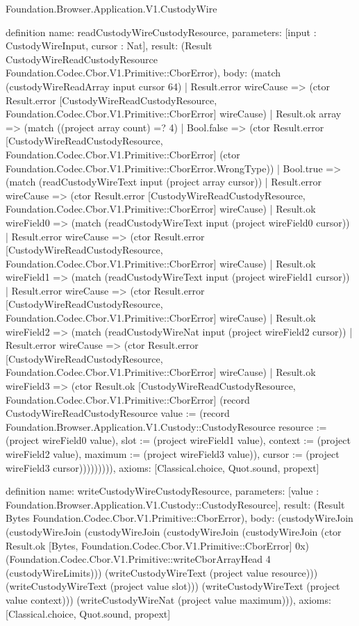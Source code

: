 \begin{lexlean}{Foundation.Browser.Application.V1.CustodyWire}
\begin{semanticmodule}
definition{
  name: readCustodyWireCustodyResource,
  parameters: [input : CustodyWireInput, cursor : Nat],
  result: (Result CustodyWireReadCustodyResource Foundation.Codec.Cbor.V1.Primitive::CborError),
  body: (match (custodyWireReadArray input cursor 64)
    | Result.error wireCause => (ctor Result.error [CustodyWireReadCustodyResource, Foundation.Codec.Cbor.V1.Primitive::CborError] wireCause)
    | Result.ok array => (match ((project array count) =? 4)
      | Bool.false => (ctor Result.error [CustodyWireReadCustodyResource, Foundation.Codec.Cbor.V1.Primitive::CborError] (ctor Foundation.Codec.Cbor.V1.Primitive::CborError.WrongType))
      | Bool.true => (match (readCustodyWireText input (project array cursor))
        | Result.error wireCause => (ctor Result.error [CustodyWireReadCustodyResource, Foundation.Codec.Cbor.V1.Primitive::CborError] wireCause)
        | Result.ok wireField0 => (match (readCustodyWireText input (project wireField0 cursor))
          | Result.error wireCause => (ctor Result.error [CustodyWireReadCustodyResource, Foundation.Codec.Cbor.V1.Primitive::CborError] wireCause)
          | Result.ok wireField1 => (match (readCustodyWireText input (project wireField1 cursor))
            | Result.error wireCause => (ctor Result.error [CustodyWireReadCustodyResource, Foundation.Codec.Cbor.V1.Primitive::CborError] wireCause)
            | Result.ok wireField2 => (match (readCustodyWireNat input (project wireField2 cursor))
              | Result.error wireCause => (ctor Result.error [CustodyWireReadCustodyResource, Foundation.Codec.Cbor.V1.Primitive::CborError] wireCause)
              | Result.ok wireField3 => (ctor Result.ok [CustodyWireReadCustodyResource, Foundation.Codec.Cbor.V1.Primitive::CborError] (record CustodyWireReadCustodyResource {value := (record Foundation.Browser.Application.V1.Custody::CustodyResource {resource := (project wireField0 value), slot := (project wireField1 value), context := (project wireField2 value), maximum := (project wireField3 value)}), cursor := (project wireField3 cursor)})))))))),
  axioms: [Classical.choice, Quot.sound, propext]
}

definition{
  name: writeCustodyWireCustodyResource,
  parameters: [value : Foundation.Browser.Application.V1.Custody::CustodyResource],
  result: (Result Bytes Foundation.Codec.Cbor.V1.Primitive::CborError),
  body: (custodyWireJoin (custodyWireJoin (custodyWireJoin (custodyWireJoin (custodyWireJoin (ctor Result.ok [Bytes, Foundation.Codec.Cbor.V1.Primitive::CborError] 0x) (Foundation.Codec.Cbor.V1.Primitive::writeCborArrayHead 4 (custodyWireLimits))) (writeCustodyWireText (project value resource))) (writeCustodyWireText (project value slot))) (writeCustodyWireText (project value context))) (writeCustodyWireNat (project value maximum))),
  axioms: [Classical.choice, Quot.sound, propext]
}


\end{semanticmodule}
\end{lexlean}
